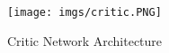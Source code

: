 \documentclass[11pt,twocolumn]{jarticle} %
\begin{document}
\begin{figure}[h]
 \begin{center}
  \texttt{[image: imgs/critic.PNG]}
  \caption{Critic Network Architecture}\label{fig:Critic}
 \end{center}
\end{figure}

\end{document}
